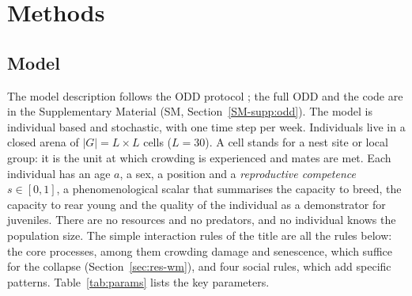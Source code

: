 \section{Methods}
\label{sec:methods}

\subsection{Model}
\label{sec:model}

The model description follows the ODD protocol \citep{Grimm2020}; the full ODD and the code are
in the Supplementary Material (SM, Section~\ref{SM-supp:odd}). The model is individual based and stochastic, with
one time step per week. Individuals live in a closed arena of $|G|=L\times L$ cells ($L=30$). A cell stands for a
nest site or local group: it is the unit at which crowding is experienced and mates are met. Each individual has an
age $a$, a sex, a position and a \emph{reproductive competence} $s\in[0,1]$, a phenomenological scalar that summarises
the capacity to breed, the capacity to rear young and the quality of the individual as a demonstrator for juveniles.
There are no resources and no predators, and no individual knows the population size. The simple interaction rules
of the title are all the rules below: the core processes, among them crowding damage and senescence, which suffice
for the collapse (Section~\ref{sec:res-wm}), and four social rules, which add specific patterns.
Table~\ref{tab:params} lists the key parameters.

